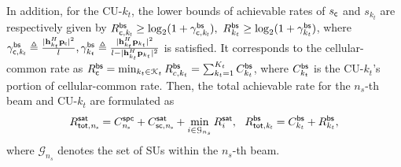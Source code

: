 \documentclass[draftclsnofoot, onecolumn, comsoc, 12pt]{IEEEtran}
\begin{document}
{In addition, for the CU-$k_{t}$, the lower bounds of achievable rates of $s_{\sf c}$ and $s_{k_{t}}$ are respectively given by }
    $R_{\sf{c}, \it{k_{t}}}^{\sf{bs}} 
\geq \mathrm{log}_{2}(1+\gamma_{\sf{c}, \it{k_{t}}}^{\sf{bs}}), \ 
    R_{k_{t}}^{\sf{bs}} 
\geq \mathrm{log}_{2}(1+\gamma_{k_{t}}^{\sf{bs}})$,
{where
    $\gamma_{{\sf c}, \it{k_{t}}}^{\sf{bs}} \triangleq \frac{|{\mathbf{h}}_{k_{t}}^{H} \mathbf{p}_{\sf{c}}|^{2}}
{l}, \gamma_{k_{t}}^{\sf{bs}} \triangleq \frac{|{\mathbf{h}}_{k_{t}}^{H} \mathbf{p}_{k_{t}}|^{2}}
{l - |{\mathbf{h}}_{k_{t}}^{H} \mathbf{p}_{k_{t}}|^{2}}$ is satisfied.}
It corresponds to the cellular-common rate as $R_{\sf{c}}^{\sf{bs}} 
= \min_{k_{t}\in \mathcal{K}_{t}}R_{c,k_{t}}^{\sf{bs}}
= \sum_{k_t=1}^{K_t}C_{k_t}^{\sf{bs}}$, where $C_{k_t}^{\sf{bs}}$ is the CU-$k_{t}$'s portion of cellular-common rate. 
Then, the total achievable rate for the $n_{s}$-th beam and CU-$k_{t}$ are formulated as
\begin{align}
    R_{\sf{tot},\it{n_{s}}}^{\sf{sat}} = C^{\sf{spc}}_{\it{n_s}}+C_{\sf{sc},\it{n_{s}}}^{\sf{sat}} + \min_{i\in\mathcal{G}_{n_{s}}}R_{i}^{\sf{sat}}, \!\!\quad R_{\sf{tot},\it{k_{t}}}^{\sf{bs}} = C_{k_{t}}^{\sf{bs}} + R_{k_{t}}^{\sf{bs}},
\end{align}
where $\mathcal{G}_{n_{s}}$ denotes the set of SUs within the $n_{s}$-th beam.
\end{document}
